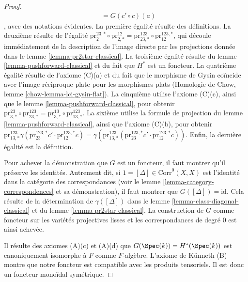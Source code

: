\begin{proof}
\begin{align*}
& =
G(c' \circ c)(a)
\end{align*},
avec des notations évidentes. La première égalité résulte des définitions.
La deuxième résulte de l'égalité
$\text{pr}^{23, *}_2 \circ \text{pr}^{12}_{2, *} =
\text{pr}^{123}_{23, *} \circ \text{pr}^{123, *}_{12}$,
qui découle immédiatement de la description de l'image directe
par les projections donnée dans le lemme \ref{lemma-pr2star-classical}.
La troisième égalité résulte du lemme \ref{lemma-pushforward-classical}
et du fait que $H^*$ est un foncteur.
La quatrième égalité résulte de l'axiome (C)(a) et du fait que
le morphisme de Gysin coïncide avec l'image réciproque plate pour les morphismes plats
(Homologie de Chow, lemme \ref{chow-lemma-lci-gysin-flat}).
La cinquième utilise l'axiome (C)(c), ainsi que
le lemme \ref{lemma-pushforward-classical}, pour obtenir
$\text{pr}^{23}_{3, *} \circ \text{pr}^{123}_{23, *} =
\text{pr}^{13}_{3, *} \circ \text{pr}^{123}_{13, *}$.
La sixième utilise la formule de projection du
lemme \ref{lemma-pushforward-classical}, ainsi que
l'axiome (C)(b), pour obtenir $
\text{pr}^{123}_{13, *}
\gamma(\text{pr}^{123, *}_{23}c' \cdot \text{pr}^{123, *}_{12}c) =
\gamma(\text{pr}^{123}_{13, *}(
\text{pr}^{123, *}_{23}c' \cdot \text{pr}^{123, *}_{12}c))$.
Enfin, la dernière égalité est la définition.

\medskip\noindent
Pour achever la démonstration que $G$ est un foncteur,
il faut montrer qu'il préserve les identités. Autrement dit, si
$1 = [\Delta] \in \text{Corr}^0(X, X)$ est l'identité
dans la catégorie des correspondances (voir
le lemme \ref{lemma-category-correspondences} et sa démonstration),
il faut montrer que $G([\Delta]) = \text{id}$.
Cela résulte de la détermination de
$\gamma([\Delta])$ dans le lemme \ref{lemma-class-diagonal-classical}
et du lemme \ref{lemma-pr2star-classical}.
La construction de $G$ comme foncteur sur les
variétés projectives lisses et les correspondances de degré $0$ est ainsi achevée.

\medskip\noindent
Il résulte des axiomes (A)(c) et (A)(d) que
$G(\Spec(k)) = H^*(\Spec(k))$ est canoniquement isomorphe à $F$
comme $F$-algèbre.
L'axiome de K\"unneth (B) montre que notre foncteur est compatible avec les produits tensoriels.
Il est donc un foncteur monoïdal symétrique.


\end{proof}
